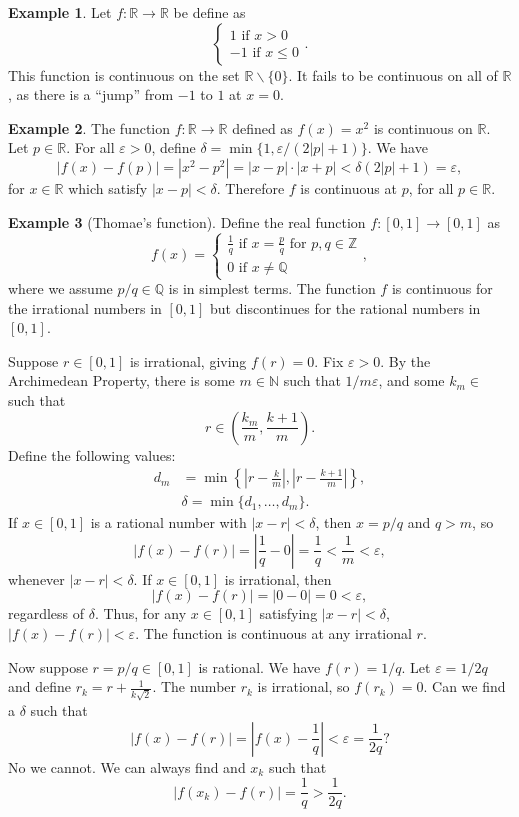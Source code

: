 \documentclass{article}
\newcommand{\N}{\mathbb{N}}
\newcommand{\R}{\mathbb{R}}
\newcommand{\Q}{\mathbb{Q}}
\newcommand{\Z}{\mathbb{Z}}
\theoremstyle{definition}
\newtheorem{example}{Example}[section]
\begin{document}
	\begin{example}
		Let $ f:\R\to\R $ be define as $$ \begin{cases}
			1\text{ if }x>0\\-1\text{ if }x\le0
		\end{cases} .$$
		This function is continuous on the set $ \R\backslash\{0\} $. It fails to be continuous on all of $ \R $, as there is a ``jump'' from $ -1 $ to $ 1 $ at $ x=0 $. 	
	\end{example}
	\begin{example}
		The function $ f:\R\to\R $ defined as $ f(x)=x^2 $ is continuous on $ \R $. Let $ p\in\R $. For all $ \varepsilon>0 $, define $ \delta=\min\{1,\varepsilon/(2|p|+1)\} $. We have $$|f(x)-f(p)|=|x^2-p^2|=|x-p|\cdot|x+p|<\delta(2|p|+1)=\varepsilon ,$$ for $ x\in \R $ which satisfy $ |x-p|<\delta $.  Therefore $ f $ is continuous at $ p $, for all $ p\in\R $. 
	\end{example}
	\begin{example}[Thomae's function]
		Define the real function $ f:[0,1]\to[0,1] $ as $$f(x)=\begin{cases}
			\frac{1}{q} \text{ if }x=\frac{p}{q}\text{ for }p,q\in\Z\\
			0\text{ if }x\neq\Q
		\end{cases} ,$$ where we assume $ p/q\in\Q $ is in simplest terms. The function $ f $ is continuous for the irrational numbers in $ [0,1] $ but discontinues for the rational numbers in $ [0,1] $. 
		
		Suppose $ r\in[0,1] $ is irrational, giving $ f(r)=0 $. Fix $ \varepsilon>0 $. By the Archimedean Property, there is some $ m\in\N $ such that $ 1/m \varepsilon$, and some $ k_m\in $ such that $$ r\in\left(\frac{k_m}{m},\frac{k+1}{m}\right) .$$ Define the following values:
		\begin{align*}
			d_m&=\min\left\{\left\lvert r-\frac{k}{m}\right\rvert,\left\lvert r-\frac{k+1}{m}\right\rvert\right\},\\
			&\delta=\min\{d_1,\ldots,d_m\}.
		\end{align*}
		If $ x\in[0,1] $ is a rational number with $ |x-r|<\delta $, then $ x=p/q $ and $ q>m $, so $$|f(x)-f(r)|=\left\lvert \frac{1}{q}-0\right\rvert=\frac{1}{q}<\frac{1}{m}<\varepsilon ,$$ whenever $ |x-r|<\delta $. If $ x\in[0,1] $ is irrational, then $$ |f(x)-f(r)|=|0-0|=0<\varepsilon ,$$ regardless of $ \delta $. Thus, for any $ x\in[0,1] $ satisfying $ |x-r|<\delta $, $ |f(x)-f(r)|<\varepsilon $. The function is continuous at any irrational $ r $.
		
		Now suppose $ r=p/q\in[0,1] $ is rational. We have $ f(r)=1/q $. Let $ \varepsilon=1/2q $ and define $ r_k=r+\frac{1}{k\sqrt{2}} $. The number $ r_k $ is irrational, so $ f(r_k)=0 $. Can we find a $ \delta $ such that $$ |f(x)-f(r)|=\left\lvert f(x)-\frac{1}{q}\right\rvert<\varepsilon=\frac{1}{2q}?$$ No we cannot. We can always find and $ x_k $ such that $$|f(x_k)-f(r)|=\frac{1}{q}>\frac{1}{2q}. $$  
	\end{example}
\end{document}
